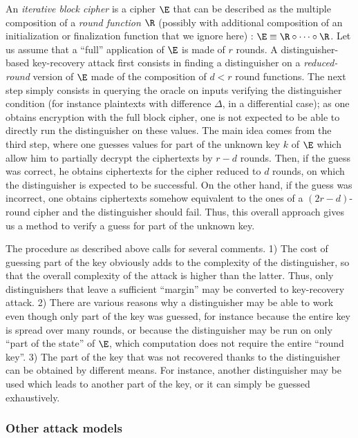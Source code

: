 An \emph{iterative block cipher} is a cipher $\E$ that can be described as the multiple composition of a \emph{round function} $\R$ (possibly with additional
composition of an initialization or finalization function that we ignore here) : $\E \equiv \R \circ \cdots \circ \R$. Let us assume that a ``full''
application of $\E$ is made of $r$ rounds. A distinguisher-based key-recovery attack first consists in finding a distinguisher on
a \emph{reduced-round} version of $\E$ made of the composition of $d < r$ round functions. The next step simply consists in querying the oracle on inputs verifying the distinguisher condition (for instance
plaintexts with difference $\Delta$, in a differential case); as one obtains encryption with the full block cipher, one is not expected to be able to directly run the distinguisher
on these values. The main idea comes from the third step, where one guesses values for part of the unknown key $k$ of $\E$ which allow him to partially decrypt the ciphertexts by $r-d$ rounds. Then, if
the guess was correct, he obtains ciphertexts for the cipher reduced to $d$ rounds, on which the distinguisher is expected to be successful. On the other hand, if the guess was incorrect, one obtains
ciphertexts somehow equivalent to the ones of a $(2r-d)$-round cipher and the distinguisher should fail. Thus, this overall approach gives us a method to verify a guess for part of the unknown key.

The procedure as described above calls for several comments. 1) The cost of guessing part of the key obviously adds to the complexity of the distinguisher, so that the overall complexity of the attack
is higher than the latter. Thus, only distinguishers that leave a sufficient ``margin'' may be converted to key-recovery attack. 2) There are various reasons why a distinguisher may be able to work
even though only part of the key was guessed, for instance because the entire key is spread over many rounds, or because the distinguisher may be run on only ``part of the state'' of $\E$, which computation
does not require the entire ``round key''. 3) The part of the key that was not recovered thanks to the distinguisher can be obtained by different means. For instance, another distinguisher may be
used which leads to another part of the key, or it can simply be guessed exhaustively.


\subsubsection{Other attack models}

